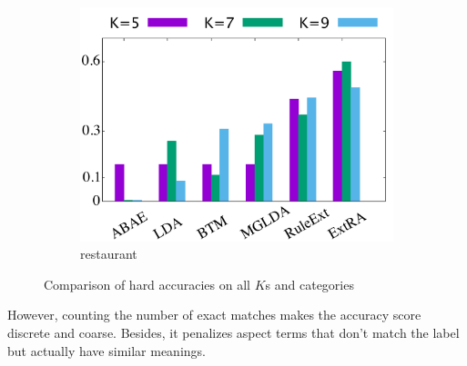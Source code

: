 \begin{figure}[!ht]
\begin{subfigure}{.333\textwidth}
		\includegraphics[width=0.99\linewidth]{figures/restaurant_h}
		\caption{restaurant}
		\label{fig:restaurant_h}
	\end{subfigure}
	
	\caption{Comparison of hard accuracies on all $K$s and categories }
	\label{fig:comparison_all_h}
\end{figure}

However, counting the number of exact matches 
makes the accuracy score discrete and coarse. 
Besides, it penalizes aspect terms that don't match the label
but actually have similar meanings.

